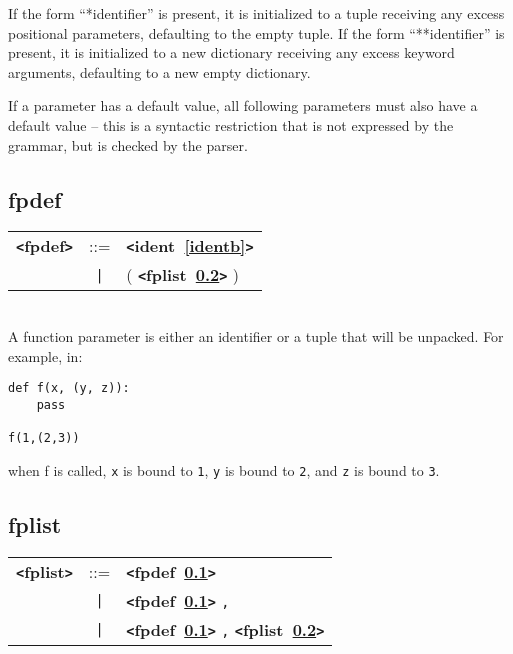 \documentclass[12pt]{article}
\begin{document}
If the form ``*identifier'' is present, it is initialized to a tuple receiving 
any excess positional parameters, defaulting to the empty tuple. 
If the form ``**identifier'' is present, it is initialized to a new dictionary 
receiving any excess keyword arguments, defaulting to a new empty dictionary.

If a parameter has a default value, all following parameters must also have a 
default value -- this is a syntactic restriction that is not expressed by the grammar, but is checked by the parser.   


\subsection{fpdef}
\label{fpdefb}
\begin{tabular}{lcl}
{\bf \verb+<+fpdef\verb+>+} & ::=  & {\bf \verb+<+ident~\ref{identb}\verb+>+}  \\
 & \verb+|+  & ( {\bf \verb+<+fplist~\ref{fplistb}\verb+>+}  ) \\
\end{tabular} \\

A function parameter is either an identifier or a tuple that will be unpacked.  For example, in:
\begin{verbatim}
def f(x, (y, z)):
    pass

f(1,(2,3))
\end{verbatim}
when f is called, \verb|x| is bound to \verb|1|, \verb|y| is bound to \verb|2|, and
\verb|z| is bound to \verb|3|. \\

\subsection{fplist}
\label{fplistb}
\begin{tabular}{lcl}
{\bf \verb+<+fplist\verb+>+} & ::=  & {\bf \verb+<+fpdef~\ref{fpdefb}\verb+>+}  \\
 & \verb+|+  & {\bf \verb+<+fpdef~\ref{fpdefb}\verb+>+}  \verb|,| \\
 & \verb+|+  & {\bf \verb+<+fpdef~\ref{fpdefb}\verb+>+}  \verb|,| {\bf \verb+<+fplist~\ref{fplistb}\verb+>+}  \\
\end{tabular}
\end{document}
